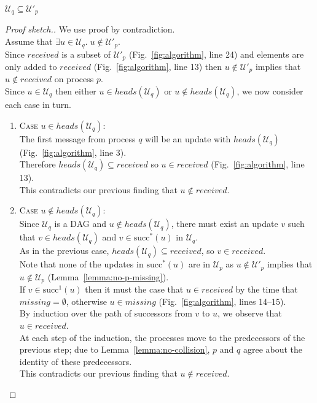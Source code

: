 \documentclass[manuscript,anonymous]{acmart}
\begin{document}
\begin{lemma}\label{lemma:no-q-missing}
$\mathcal{U}_q \subseteq \mathcal{U}'_p$
\end{lemma}
\begin{proof}[Proof sketch.]
We use proof by contradiction.\\
Assume that $\exists u \in \mathcal{U}_q.\; u \notin  \mathcal{U}'_p$.\\
Since $\mathit{received}$ is a subset of $\mathcal{U}'_p$ (Fig.~\ref{fig:algorithm}, line 24) and elements are only added to $\mathit{received}$ (Fig.~\ref{fig:algorithm}, line 13) then $u \notin  \mathcal{U}'_p$ implies that $u \notin \mathit{received}$ on process $p$.\\
Since $u \in \mathcal{U}_q$ then either $u \in \mathit{heads}(\mathcal{U}_q)$ or $u \notin \mathit{heads}(\mathcal{U}_q)$, we now consider each case in turn.
\begin{enumerate}
    \item\textsc{Case} $u \in heads(\mathcal{U}_q)$:\\
    The first message from process $q$ will be an update with $\mathit{heads}(\mathcal{U}_q)$ (Fig.~\ref{fig:algorithm}, line 3).\\
    Therefore $\mathit{heads}(\mathcal{U}_q) \subseteq \mathit{received}$ so $u \in \mathit{received}$ (Fig.~\ref{fig:algorithm}, line 13).\\
    This contradicts our previous finding that $u \notin \mathit{received}$.
    
    \item\textsc{Case} $u \notin \mathit{heads}(\mathcal{U}_q)$:\\
    Since $\mathcal{U}_q$ is a DAG and $u \notin \mathit{heads}(\mathcal{U}_q)$, there must exist an update $v$ such that $v \in \mathit{heads}(\mathcal{U}_q)$ and $v \in \mathrm{succ}^*(u)$ in $\mathcal{U}_q$.\\
    As in the previous case, $\mathit{heads}(\mathcal{U}_q) \subseteq \mathit{received}$, so $v \in \mathit{received}$.\\
    Note that none of the updates in $\mathrm{succ}^*(u)$ are in $\mathcal{U}_p$ as $u \notin \mathcal{U}'_p$ implies that  $u \notin \mathcal{U}_p$ (Lemma~\ref{lemma:no-p-missing}).\\
    If $v \in \mathrm{succ}^1(u)$ then it must the case that $u \in \mathit{received}$ by the time that $\mathit{missing} = \emptyset$, otherwise $u \in \mathit{missing}$ (Fig.~\ref{fig:algorithm}, lines 14--15).\\
    By induction over the path of successors from $v$ to $u$, we observe that $u \in \mathit{received}$.\\
    At each step of the induction, the processes move to the predecessors of the previous step; due to Lemma~\ref{lemma:no-collision}, $p$ and $q$ agree about the identity of these predecessors.\\
    This contradicts our previous finding that $u \notin \mathit{received}$.
\end{enumerate}
\end{proof}
\end{document}
